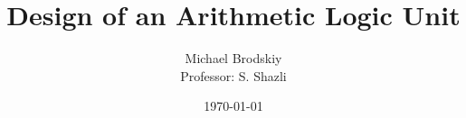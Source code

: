


\pagestyle{fancy}

\title{Design of an Arithmetic Logic Unit}
\date{\today}
\author{Michael Brodskiy\\ \small Professor: S. Shazli}



\maketitle

\thispagestyle{fancy}

\newpage

